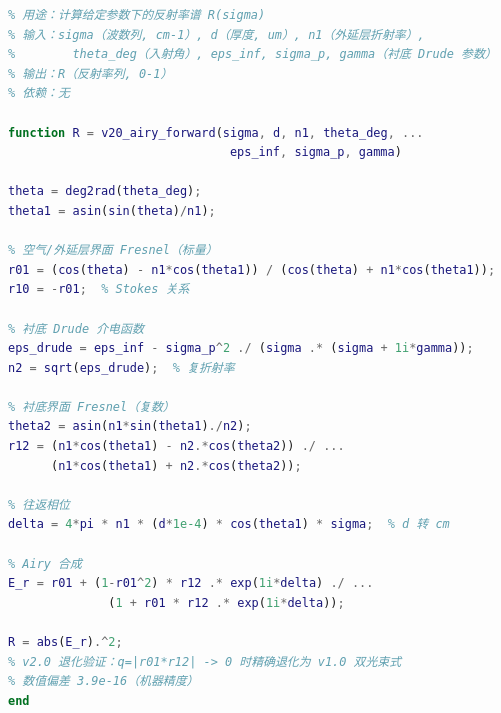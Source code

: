 \begin{lstlisting}[language=Matlab, caption={Airy 多光束前向模型核心代码（v2.0）}]
% v2.0 Airy 多光束前向模型 — 三介质 Airy 合成
% 用途：计算给定参数下的反射率谱 R(sigma)
% 输入：sigma（波数列, cm-1）, d（厚度, um）, n1（外延层折射率）,
%        theta_deg（入射角）, eps_inf, sigma_p, gamma（衬底 Drude 参数）
% 输出：R（反射率列, 0-1）
% 依赖：无

function R = v20_airy_forward(sigma, d, n1, theta_deg, ...
                               eps_inf, sigma_p, gamma)

theta = deg2rad(theta_deg);
theta1 = asin(sin(theta)/n1);

% 空气/外延层界面 Fresnel（标量）
r01 = (cos(theta) - n1*cos(theta1)) / (cos(theta) + n1*cos(theta1));
r10 = -r01;  % Stokes 关系

% 衬底 Drude 介电函数
eps_drude = eps_inf - sigma_p^2 ./ (sigma .* (sigma + 1i*gamma));
n2 = sqrt(eps_drude);  % 复折射率

% 衬底界面 Fresnel（复数）
theta2 = asin(n1*sin(theta1)./n2);
r12 = (n1*cos(theta1) - n2.*cos(theta2)) ./ ...
      (n1*cos(theta1) + n2.*cos(theta2));

% 往返相位
delta = 4*pi * n1 * (d*1e-4) * cos(theta1) * sigma;  % d 转 cm

% Airy 合成
E_r = r01 + (1-r01^2) * r12 .* exp(1i*delta) ./ ...
              (1 + r01 * r12 .* exp(1i*delta));

R = abs(E_r).^2;
% v2.0 退化验证：q=|r01*r12| -> 0 时精确退化为 v1.0 双光束式
% 数值偏差 3.9e-16（机器精度）
end
\end{lstlisting}
